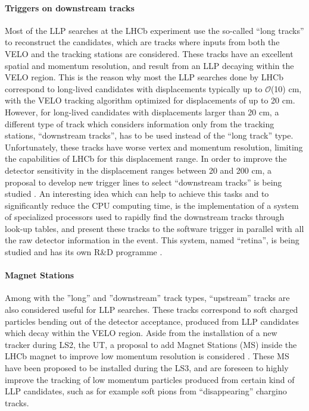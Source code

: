 \paragraph{Triggers on downstream tracks}
Most of the LLP searches at the LHCb experiment use the so-called ``long tracks'' to reconstruct the candidates, which are tracks where inputs from both the VELO and the tracking stations are considered. These tracks have an excellent spatial and momentum resolution, and result from an LLP decaying within the VELO region. This is the reason why most the LLP searches done by LHCb correspond to long-lived candidates with displacements typically up to $\mathcal{O}$(10) cm, with the VELO tracking algorithm optimized for displacements of up to 20 cm. However, for long-lived candidates with displacements larger than 20 cm, a different type of track which considers information only from the tracking stations, ``downstream tracks'', has to be used instead of the ``long track'' type. Unfortunately, these tracks have worse vertex and momentum resolution, limiting the capabilities of LHCb for this displacement range. In order to improve the detector sensitivity in the displacement ranges between 20 and 200 cm, a proposal to develop new trigger lines to select ``downstream tracks'' is being studied \cite{Aaij:2244312}. An interesting idea which can help to achieve this tasks and to significantly reduce the CPU computing time, is the implementation of a system of specialized processors used to  rapidly find the downstream tracks through look-up tables, and present these tracks to the software trigger in parallel with all the raw detector information in the event. This system, named ``retina'', is being studied and has its own R\&D programme \cite{Abba:2014iga}. 

\paragraph{Magnet Stations}
Among with the ''long'' and ''downstream'' track types, ``upstream'' tracks are also considered useful for LLP searches. These tracks correspond to soft charged particles bending out of the detector acceptance, produced from LLP candidates which decay within the VELO region. Aside from the installation of a new tracker during LS2, the UT, a proposal to add Magnet Stations (MS) inside the LHCb magnet to improve low momentum resolution is considered \cite{Aaij:2244311}. These MS have been proposed to be installed during the LS3, and are foreseen to highly improve the tracking of low momentum particles produced from certain kind of LLP candidates, such as for example soft pions from ``disappearing'' chargino tracks.


